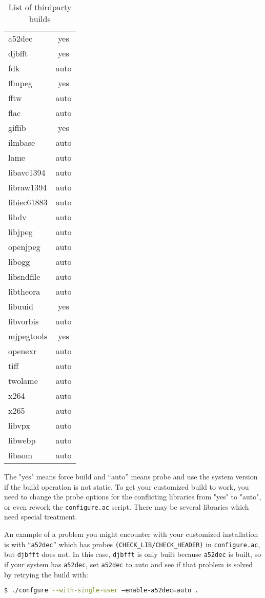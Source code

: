 \begin{table}[htpb]
    \centering
    \caption{List of thirdparty builds}
    \label{tab:List_of_thirdparty_builds}
        \small
    \begin{tabular}{m{8em}c}
        \toprule
 	a52dec   & yes\\
 	djbfft   & yes\\
	fdk      & auto\\
 	ffmpeg   & yes\\
 	fftw     & auto\\
 	flac     & auto\\
 	giflib   & yes\\
 	ilmbase&auto\\
 	lame    &  auto\\
 	libavc1394&auto\\
 	libraw1394&auto\\
 	libiec61883&auto\\
	libdv     &auto\\
 	libjpeg   &auto\\
 	openjpeg  &auto\\
 	libogg    &auto\\
 	libsndfile&auto\\
 	libtheora&auto\\
 	libuuid  & yes\\
 	libvorbis&auto\\
 	mjpegtools&yes\\
 	openexr   &auto\\
	tiff      &auto\\
 	twolame   &auto\\
 	x264      &auto\\
 	x265      &auto\\
 	libvpx	&auto\\
	libwebp&auto\\
	libaom&	auto\\
    \bottomrule
    \end{tabular}
\end{table}


The "yes" means force build and “auto” means probe and use the system version if the build operation is not static.  
To get your customized build to work, you need to change the probe options for the conflicting libraries from "yes" to "auto", or even rework the \texttt{configure.ac} script.  
There may be several libraries which need special treatment.

An example of a problem you might encounter with your customized installation is with “\texttt{a52dec}” which has probes \texttt{(CHECK\_LIB/CHECK\_HEADER)} in \texttt{configure.ac}, but \texttt{djbfft} does not.  
In this case, \texttt{djbfft} is only built because \texttt{a52dec} is built, so if your system has \texttt{a52dec}, set \texttt{a52dec} to auto and see if that problem is solved by retrying the build with:  
\begin{lstlisting}[language=bash]
$ ./confgure --with-single-user –enable-a52dec=auto .
\end{lstlisting}

